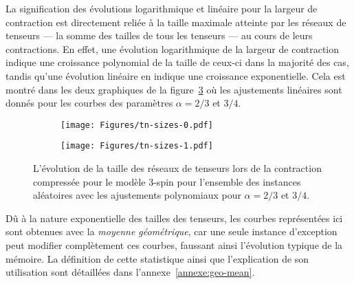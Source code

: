 La signification des évolutions logarithmique et linéaire pour la largeur de contraction est directement reliée à la taille maximale atteinte par les réseaux de tenseurs --- la somme des tailles de tous les tenseurs --- au cours de leurs contractions.
En effet, une évolution logarithmique de la largeur de contraction indique une croissance polynomial de la taille de ceux-ci dans la majorité des cas, tandis qu'une évolution linéaire en indique une croissance exponentielle.
Cela est montré dans les deux graphiques de la figure~\ref{fig:tn-sizes} où les ajustements linéaires sont donnés pour les courbes des paramètres $\alpha = 2/3$ et $3/4$.
\begin{figure}[h]
    \centering
    \begin{subfigure}{.49\textwidth}
        \centering
        \texttt{[image: Figures/tn-sizes-0.pdf]}
        \caption{}
        \label{subfig:tn-sizes-0}
    \end{subfigure}
    \hfill
    \begin{subfigure}{.49\textwidth}
        \centering
        \texttt{[image: Figures/tn-sizes-1.pdf]}
        \caption{}
        \label{subfig:tn-sizes-1}
    \end{subfigure}
    \caption[L'évolution de la taille des réseaux de tenseurs lors de la contraction compressée pour le modèle $3$-spin.]{L'évolution de la taille des réseaux de tenseurs lors de la contraction compressée pour le modèle $3$-spin pour l'ensemble des instances aléatoires avec les ajustements polynomiaux pour $\alpha = 2/3$ et $3/4$.}
    \label{fig:tn-sizes}
\end{figure}
Dû à la nature exponentielle des tailles des tenseurs, les courbes représentées ici sont obtenues avec la \emph{moyenne géométrique}, car une seule instance d'exception peut modifier complètement ces courbes, faussant ainsi l'évolution typique de la mémoire.
La définition de cette statistique ainsi que l'explication de son utilisation sont détaillées dans l'annexe~\ref{annexe:geo-mean}.

